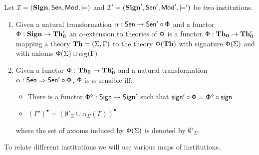 \documentclass[10pt]{article}
\begin{document}
\begin{definition}
Let ${\mathcal{I}}= ({{\bf Sign}},{\sf {Sen}},{\sf {Mod}},\models)$ and
${\mathcal{I'}}=({{\bf Sign}'},{\sf {Sen}}',{\sf {Mod}}',\models')$ be two institutions.
\begin{enumerate}\MyLPar
\item
Given a natural transformation $\alpha:{\sf {Sen}}
\to {\sf {Sen'}} \circ {\sf {\Phi}}$ and a functor ${\sf {\Phi}}:{\bf Sign} \to
{\bf Th_0'}$
an $\alpha$-extension to theories of ${\sf {\Phi}}$ is a functor ${\sf {\Phi}}:{\bf Th_0} \to {\bf Th_0'}$ mapping a
theory ${\bf Th}=(\Sigma,\Gamma)$ to the theory ${\sf {\Phi}}({\bf Th})$ with
signature ${\sf {\Phi}}(\Sigma)$ and with axioms ${\sf {\Phi}}(\Sigma) \cup
\alpha_{\Sigma}(\Gamma)$
\item
Given a functor ${\sf {\Phi}}:{\bf Th_0} \to {\bf Th_0'}$ and a natural
transformation $\alpha: {\sf {Sen}} \Rightarrow {\sf {Sen}}' \circ {\sf {\Phi}}$, ${\sf {\Phi}}$ is
$\alpha$-sensible iff:
\begin{itemize}\MyLPar
	\item There is a functor ${\sf {\Phi^{\diamond}}}:{\sf {Sign}} \to {\sf {Sign'}}$ such that ${\sf {sign'}} \circ {\sf {\Phi}} ={\sf {\Phi^\diamond}}  \circ  {\sf {sign}}$
	\item $(\Gamma')^\bullet = (\emptyset'_{\Sigma} \cup \alpha_{\Sigma}(\Gamma))^{\bullet}$
\end{itemize}
where the set of axioms induced by ${\sf {\Phi}}(\Sigma)$ is denoted by
$\emptyset'_{\Sigma}$.
\end{enumerate}
\end{definition}
%
To relate different institutions we will use various maps of institutions.
\end{document}
